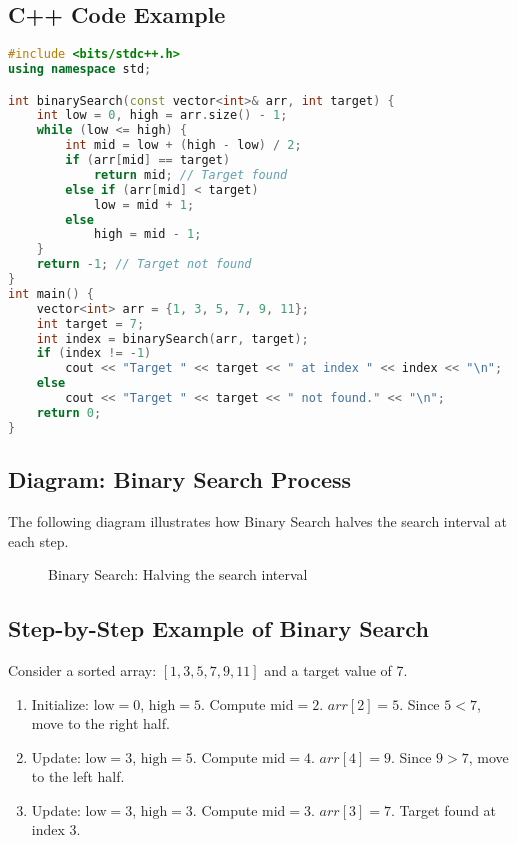 \subsection{C++ Code Example}
\begin{lstlisting}[language=C++, caption={Binary Search Implementation}]
#include <bits/stdc++.h>
using namespace std;

int binarySearch(const vector<int>& arr, int target) {
    int low = 0, high = arr.size() - 1;
    while (low <= high) {
        int mid = low + (high - low) / 2;
        if (arr[mid] == target)
            return mid; // Target found
        else if (arr[mid] < target)
            low = mid + 1;
        else
            high = mid - 1;
    }
    return -1; // Target not found
}
int main() {
    vector<int> arr = {1, 3, 5, 7, 9, 11};
    int target = 7;
    int index = binarySearch(arr, target);
    if (index != -1)
        cout << "Target " << target << " at index " << index << "\n";
    else
        cout << "Target " << target << " not found." << "\n";
    return 0;
}
\end{lstlisting}

\subsection{Diagram: Binary Search Process}
The following diagram illustrates how Binary Search halves the search interval at each step.

\begin{figure}[H]
\centering
{}
\caption{Binary Search: Halving the search interval}
\end{figure}

\subsection{Step-by-Step Example of Binary Search}
Consider a sorted array: \([1, 3, 5, 7, 9, 11]\) and a target value of 7.
\begin{enumerate}
  \item Initialize: \(\text{low} = 0\), \(\text{high} = 5\). Compute \(\text{mid} = 2\). \(arr[2] = 5\). Since \(5 < 7\), move to the right half.
  \item Update: \(\text{low} = 3\), \(\text{high} = 5\). Compute \(\text{mid} = 4\). \(arr[4] = 9\). Since \(9 > 7\), move to the left half.
  \item Update: \(\text{low} = 3\), \(\text{high} = 3\). Compute \(\text{mid} = 3\). \(arr[3] = 7\). Target found at index 3.
\end{enumerate}


